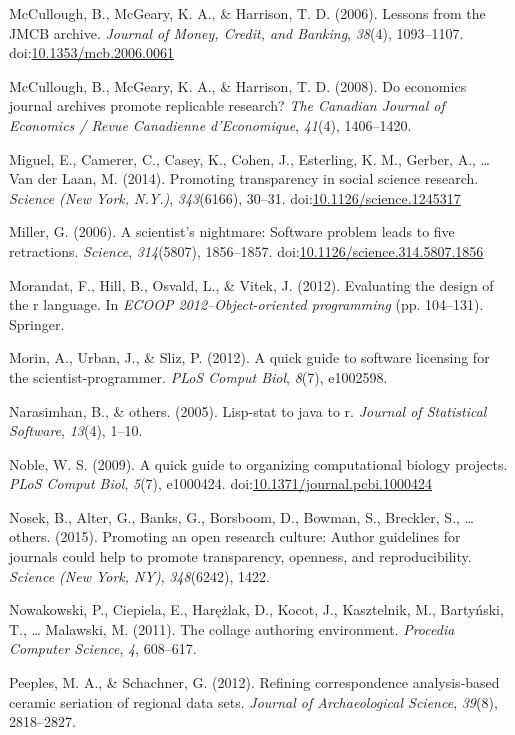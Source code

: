\documentclass[american,man]{apa6}
\newcounter{author}
\begin{document}
{McCullough}, B., {McGeary}, K. A., \& Harrison, T. D. (2006). Lessons
from the JMCB archive. \emph{Journal of Money, Credit, and Banking},
\emph{38}(4), 1093--1107.
doi:\href{http://dx.doi.org/10.1353/mcb.2006.0061}{10.1353/mcb.2006.0061}

{McCullough}, B., {McGeary}, K. A., \& Harrison, T. D. (2008). Do
economics journal archives promote replicable research? \emph{The
Canadian Journal of Economics / Revue Canadienne d'Economique},
\emph{41}(4), 1406--1420.

Miguel, E., Camerer, C., Casey, K., Cohen, J., Esterling, K. M., Gerber,
A., \ldots{} Van der Laan, M. (2014). Promoting transparency in social
science research. \emph{Science (New York, N.Y.)}, \emph{343}(6166),
30--31.
doi:\href{http://dx.doi.org/10.1126/science.1245317}{10.1126/science.1245317}

Miller, G. (2006). A scientist's nightmare: Software problem leads to
five retractions. \emph{Science}, \emph{314}(5807), 1856--1857.
doi:\href{http://dx.doi.org/10.1126/science.314.5807.1856}{10.1126/science.314.5807.1856}

Morandat, F., Hill, B., Osvald, L., \& Vitek, J. (2012). Evaluating the
design of the r language. In \emph{ECOOP 2012--Object-oriented
programming} (pp. 104--131). Springer.

Morin, A., Urban, J., \& Sliz, P. (2012). A quick guide to software
licensing for the scientist-programmer. \emph{PLoS Comput Biol},
\emph{8}(7), e1002598.

Narasimhan, B., \& others. (2005). Lisp-stat to java to r. \emph{Journal
of Statistical Software}, \emph{13}(4), 1--10.

Noble, W. S. (2009). A quick guide to organizing computational biology
projects. \emph{PLoS Comput Biol}, \emph{5}(7), e1000424.
doi:\href{http://dx.doi.org/10.1371/journal.pcbi.1000424}{10.1371/journal.pcbi.1000424}

Nosek, B., Alter, G., Banks, G., Borsboom, D., Bowman, S., Breckler, S.,
\ldots{} others. (2015). Promoting an open research culture: Author
guidelines for journals could help to promote transparency, openness,
and reproducibility. \emph{Science (New York, NY)}, \emph{348}(6242),
1422.

Nowakowski, P., Ciepiela, E., Har{\k{e}}{ż}lak, D., Kocot, J.,
Kasztelnik, M., Barty{ń}ski, T., \ldots{} Malawski, M. (2011). The
collage authoring environment. \emph{Procedia Computer Science},
\emph{4}, 608--617.

Peeples, M. A., \& Schachner, G. (2012). Refining correspondence
analysis-based ceramic seriation of regional data sets. \emph{Journal of
Archaeological Science}, \emph{39}(8), 2818--2827.
\end{document}
